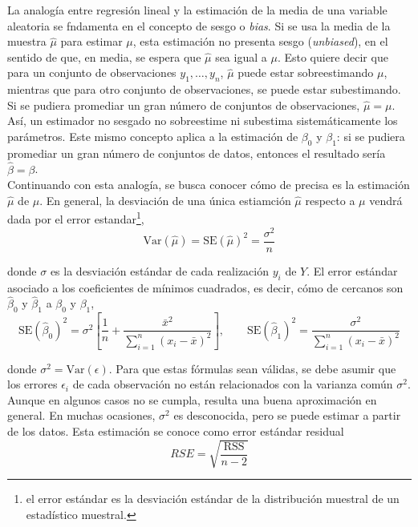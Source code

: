 La analogía entre regresión lineal y la estimación de la media de una variable aleatoria se fndamenta en el concepto de sesgo o \textit{bias}. Si se usa la media de la muestra $\hat{\mu}$ para estimar $\mu$, esta estimación no presenta sesgo (\textit{unbiased}), en el sentido de que, en media, se espera que $\hat{\mu}$ sea igual a $\mu$. Esto quiere decir que para un conjunto de observaciones $y_1, \dots, y_n$, $\hat{\mu}$ puede estar sobreestimando $\mu$, mientras que para otro conjunto de observaciones, se puede estar subestimando. Si se pudiera promediar un gran número de conjuntos de observaciones, $\hat{\mu} = \mu$. Así, un estimador no sesgado no sobreestime ni subestima sistemáticamente los parámetros. Este mismo concepto aplica a la estimación de $\beta_0$ y $\beta_1$: si se pudiera promediar un gran número de conjuntos de datos, entonces el resultado sería $\hat{\beta} = \beta$. \\

Continuando con esta analogía, se busca conocer cómo de precisa es la estimación $\hat{\mu}$ de $\mu$. En general, la desviación de una única estiamción $\hat{\mu}$ respecto a $\mu$ vendrá dada por el error estandar\footnote{el error estándar es la desviación estándar de la distribución muestral de un estadístico muestral.}, 
\begin{equation}
\text{Var}(\hat{\mu}) = \text{SE}(\hat{\mu})^2 = \frac{\sigma^2}{n}
\end{equation}

\noindent donde $\sigma$ es la desviación estándar de cada realización $y_i$ de $Y$. El error estándar asociado a los coeficientes de mínimos cuadrados, es decir, cómo de cercanos son $\hat{\beta}_0$ y $\hat{\beta}_1$ a $\beta_0$ y $\beta_1$, 
\begin{equation}
\text{SE}(\hat{\beta}_0)^2 = \sigma^2 \left[\frac{1}{n} + \frac{\bar{x}^2}{\sum_{i=1}^n (x_i - \bar{x})^2}\right], \qquad \text{SE}(\hat{\beta}_1)^2 = \frac{\sigma^2}{\sum_{i=1}^n (x_i - \bar{x})^2}
\end{equation}

\noindent donde $\sigma^2 = \text{Var}(\epsilon)$. Para que estas fórmulas sean válidas, se debe asumir que los errores $\epsilon_i$ de cada observación no están relacionados con la varianza común $\sigma^2$. Aunque en algunos casos no se cumpla, resulta una buena aproximación en general. En muchas ocasiones, $\sigma^2$ es desconocida, pero se puede estimar a partir de los datos. Esta estimación se conoce como error estándar residual
\begin{equation}
RSE = \sqrt{\frac{\text{RSS}}{n-2}}
\end{equation}

